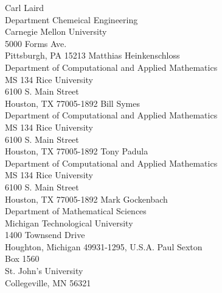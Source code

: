 \documentclass[pdf,ps2pdf,11pt]{SANDreport}
\begin{document}
\begin{SANDdistribution}
 Carl Laird \\ Department Chemeical Engineering\\Carnegie Mellon University\\5000 Forms Ave.\\Pittsburgh, PA 15213
 Matthias Heinkenschloss \\ Department of Computational and Applied Mathematics\\MS 134 Rice University\\
6100 S. Main Street\\Houston, TX 77005-1892
 Bill Symes\\Department of Computational and Applied Mathematics\\MS 134 Rice University\\
6100 S. Main Street\\Houston, TX 77005-1892
 Tony Padula\\Department of Computational and Applied Mathematics\\MS 134 Rice University\\
6100 S. Main Street\\Houston, TX 77005-1892
 Mark Gockenbach \\ Department of Mathematical Sciences\\Michigan Technological University\\ 
1400 Townsend Drive\\Houghton, Michigan 49931-1295, U.S.A.
 Paul Sexton \\ Box 1560 \\ St. John's University \\ Collegeville, MN 56321

\end{SANDdistribution}
\end{document}
